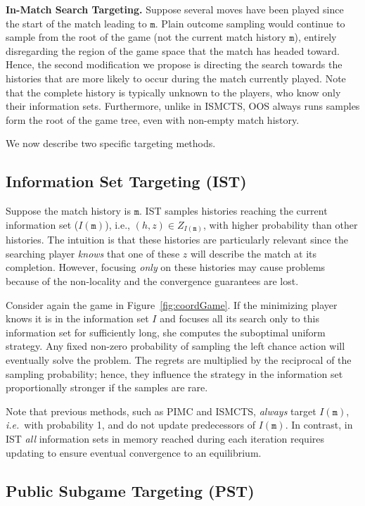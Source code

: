 \documentclass{aamas2015}
\newcommand{\ttm}{\mathtt{m}}
\newcommand{\ie}{{\it i.e.}~}
\begin{document}
{\bf In-Match Search Targeting.}
Suppose several moves have been played since the start of the match leading to $\ttm$. 
Plain outcome sampling would continue to sample from the root of the game (not the current match history $\ttm$), entirely 
disregarding the region of the game space that the match has headed toward. 
Hence, the second modification we propose is directing the search towards the histories that are more likely to occur during the match currently played.
Note that the complete history is typically unknown to the players, who know only their information sets.
Furthermore, unlike in ISMCTS, OOS always runs samples form the root of the game tree, even with non-empty match history.

We now describe two specific targeting methods.

\subsection{Information Set Targeting (IST)}

Suppose the match history is $\ttm$. IST samples histories reaching the current information set ($I(\ttm)$), 
i.e., $(h,z) \in Z_{I(\ttm)}$, with higher probability than other histories.
The intuition is that these histories are particularly 
relevant since the searching player {\it knows} that one of these $z$ will describe the match at its completion. 
However, focusing {\it only} on these histories may cause problems because of the non-locality and the convergence guarantees are lost.

Consider again the game in Figure~\ref{fig:coordGame}. 
If the minimizing player knows it is in the information set $I$ and focuses all its search only to this information set for sufficiently long, she computes the suboptimal uniform strategy.
Any fixed non-zero probability of sampling the left chance action will 
eventually solve the problem. The regrets are multiplied by the reciprocal of the sampling probability; hence, they influence the strategy 
in the information set proportionally stronger if the samples are rare.

Note that previous methods, such as PIMC and ISMCTS, {\it always} target $I(\ttm)$, \ie with probability 1, and do not 
update predecessors of $I(\ttm)$. In contrast, in IST {\it all} information sets in memory reached during each iteration requires updating 
to ensure eventual convergence to an equilibrium.

\subsection{Public Subgame Targeting (PST)}
\end{document}
